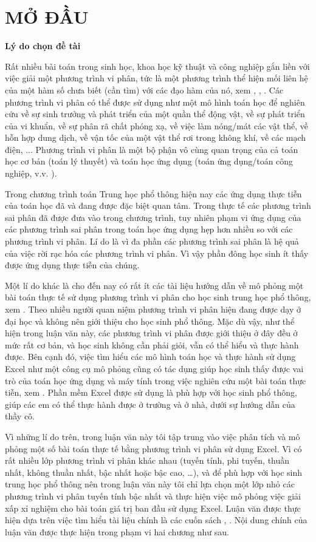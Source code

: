 \section*{MỞ ĐẦU}
\noindent \textbf{Lý do chọn đề tài}

Rất nhiều bài toán trong sinh học, khoa học kỹ thuật và công nghiệp gắn liền với việc giải một phương trình vi phân, tức là một phương trình thể hiện mối liên hệ của một hàm số chưa biết (cần tìm) với các đạo hàm của nó, xem \cite{ref1}, \cite{ref4}, \cite{ref6}. Các phương trình vi phân có thể được sử dụng như một mô hình toán học để nghiên cứu về sự sinh trưởng và phát triển của một quần thể động vật, về sự phát triển của vi khuẩn, về sự phân rã chất phóng xạ, về việc làm nóng/mát các vật thể, về hỗn hợp dung dịch, về vận tốc của một vật thể rơi trong không khí, về các mạch điện, ... Phương trình vi phân là một bộ phận vô cùng quan trọng của cả toán học cơ bản (toán lý thuyết) và toán học ứng dụng (toán ứng dụng/toán công nghiệp, v.v. ). 

Trong chương trình toán Trung học phổ thông hiện nay các ứng dụng thực tiễn của toán học đã và đang được đặc biệt quan tâm. Trong thực tế các phương trình sai phân đã được đưa vào trong chương trình, tuy nhiên phạm vi ứng dụng của các phương trình sai phân trong toán học ứng dụng hẹp hơn nhiều so với các phương trình vi phân. Lí do là vì đa phần các phương trình sai phân là hệ quả của việc rời rạc hóa các phương trình vi phân. Vì vậy phần đông học sinh ít thấy được ứng dụng thực tiễn của chúng. 

Một lí do khác là cho đến nay có rất ít các tài liệu hướng dẫn về mô phỏng một bài toán thực tế sử dụng phương trình vi phân cho học sinh trung học phổ thông, xem \cite{ref3}. Theo nhiều người quan niệm phương trình vi phân hiện đang được dạy ở đại học và không nên giới thiệu cho học sinh phổ thông. Mặc dù vậy, như thể hiện trong luận văn này, các phương trình vi phân được giới thiệu ở đây đều ở mức rất cơ bản, và học sinh không cần phải giỏi, vẫn có thể hiểu và thực hành được. Bên cạnh đó, việc tìm hiểu các mô hình toán học và thực hành sử dụng Excel như một công cụ mô phỏng cũng có tác dụng giúp học sinh thấy được vai trò của toán học ứng dụng và máy tính trong việc nghiên cứu một bài toán thực tiễn, xem \cite{ref5}. Phần mềm Excel được sử dụng là phù hợp với học sinh phổ thông, giúp các em có thể thực hành được ở trường và ở nhà, dưới sự hướng dẫn của thầy cô. 

Vì những lí do trên, trong luận văn này tôi tập trung vào việc phân tích và mô phỏng một số bài toán thực tế bằng phương trình vi phân sử dụng Excel. Vì có rất nhiều lớp phương trình vi phân khác nhau (tuyến tính, phi tuyến, thuần nhất, không thuần nhất, bậc nhất hoặc bậc cao, …), và để phù hợp với học sinh trung học phổ thông nên trong luận văn này tôi chỉ lựa chọn một lớp nhỏ các phương trình vi phân tuyến tính bậc nhất và thực hiện việc mô phỏng việc giải xấp xỉ nghiệm cho bài toán giá trị ban đầu sử dụng Excel. Luận văn được thực hiện dựa trên việc tìm hiểu tài liệu chính là các cuốn sách \cite{ref3}, \cite{ref5}. Nội dung chính của luận văn được thực hiện trong phạm vi hai chương như sau.

